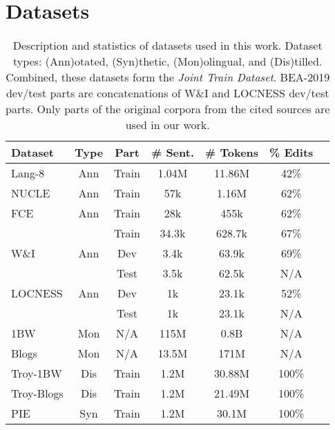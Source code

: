 \documentclass[11pt]{article}
\begin{document}
\section{Datasets}
 \begin{table}
 \scriptsize
 \begin{tabular}{|l|c|c|c|c|c|c|}
 \hline

 \textbf{Dataset} & \textbf{Type}  &  \textbf{Part} & \textbf{\# Sent.} & \textbf{\# Tokens} & \textbf{\% Edits} \\

  \hline
        Lang-8  & Ann        & Train          & 1.04M             & 11.86M & 42\%\\
 \hline
       NUCLE    & Ann        & Train          & 57k               & 1.16M & 62\% \\
 \hline
        FCE      & Ann        & Train          & 28k               & 455k & 62\% \\
  \hline
                &                   & Train          & 34.3k             & 628.7k &  67\%  \\
         W\&I   & Ann         & Dev            & 3.4k              & 63.9k &  69\% \\
                &                   & Test           & 3.5k              & 62.5k &   N/A \\
  \hline

         LOCNESS    & Ann         & Dev            & 1k              & 23.1k & 52\% \\
                &                   & Test           & 1k              & 23.1k &   N/A\\
  \hline
        1BW     & Mon       & N/A           &  115M  &  0.8B & N/A \\
 \hline        
        Blogs     & Mon      & N/A           & 13.5M  & 171M & N/A \\
\hline
        Troy-1BW     & Dis       & Train           &  1.2M  & 30.88M & 100\% \\
 \hline        
        Troy-Blogs     & Dis      & Train           & 1.2M  & 21.49M & 100\% \\
\hline
PIE     & Syn        & Train           & 1.2M  & 30.1M & 100\%\\


\hline
\end{tabular}
\caption{Description and statistics of datasets used in this work. Dataset types: (Ann)otated, (Syn)thetic, (Mon)olingual, and (Dis)tilled. Combined, these datasets form the \textit{Joint Train Dataset}. BEA-2019 dev/test parts are concatenations of W\&I and LOCNESS dev/test parts. Only parts of the original corpora from the cited sources are used in our work. }\label{training-data-table-new}
\end{table} 
\end{document}

